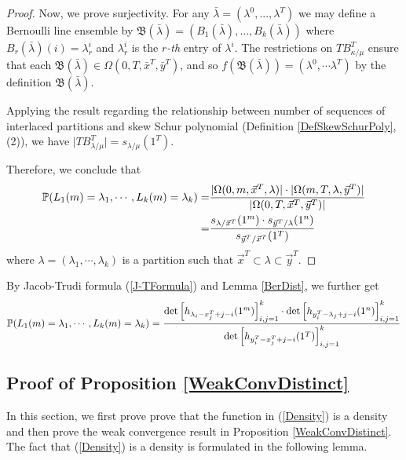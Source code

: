 \begin{proof}
Now, we prove surjectivity. For any $\bar\lambda=(\lambda^0,...,\lambda^T)$ we may define a Bernoulli line ensemble by $\mathfrak{B}(\bar\lambda)=(B_1(\bar\lambda),...,B_k(\bar\lambda))$ where $B_r(\bar\lambda)(i)=\lambda^i_r$ and $\lambda^i_r$ is the $r$\textit{-th} entry of $\lambda^i$. The restrictions on $TB_{\kappa/\mu}^T$ ensure that each $\mathfrak{B}(\bar\lambda)\in \Omega(0,T,\bar x^T,\bar y^T)$, and so $f(\mathfrak B(\bar{\lambda}))=(\lambda^0,\cdots \lambda^T)$ by the definition $\mathfrak{B}(\bar\lambda)$. 

Applying the result regarding the relationship between number of sequences of interlaced partitions and skew Schur polynomial (Definition \ref{DefSkewSchurPoly}, (2)), we have $\lvert TB_{\lambda/\mu}^T\rvert =s_{\lambda/\mu}(1^T)$.

Therefore, we conclude that 
\begin{align*}
\mathbb{P}(L_1(m)=\lambda_1,\cdots, L_k(m)=\lambda_k)
=&{}\frac{\lvert \Omega(0, m, \vec{x}^T, \lambda)\rvert\cdot \lvert \Omega(m, T, \lambda, \vec{y}^T)\rvert}{\lvert \Omega(0, T, \vec{x}^T, \vec{y}^T)\rvert}\\
=&{}\frac{s_{\lambda/\vec{x}^T}(1^{m})\cdot s_{\vec{y}^T/\lambda}(1^{n})}{s_{\vec{y}^T/\vec{x}^T}(1^T)}
\end{align*} where $\lambda=(\lambda_{1},\cdots,\lambda_{k})$ is a partition such that $\vec{x}^{T}\subset\lambda\subset\vec{y}^{T}$.
\end{proof}

By Jacob-Trudi formula (\ref	{J-TFormula}) and Lemma \ref	{BerDist}, we further get
\begin{align}{\label{BerDistJT}}
	\begin{split}
		\mathbb{P}(L_1(m)=\lambda_1,\cdots, L_k(m)=\lambda_k)=\frac{\det\left[h_{\lambda_{i}-x_{j}^{T}+j-i}(1^{m})\right]_{i,j=1}^{k}\cdot\det\left[h_{y_{i}^{T}-\lambda_{j}+j-i}(1^{n})\right]_{i,j=1}^{k}}{\det\left[h_{y_{i}^{T}-x_{j}^{T}+j-i}(1^{T})\right]_{i,j=1}^{k}}
	\end{split}
\end{align}

\subsection{Proof of Proposition \ref{WeakConvDistinct}}{\label{ProofProp1}} In this section, we first prove prove that the function in (\ref{Density}) is a density and then prove the weak convergence result in Proposition \ref{WeakConvDistinct}. The fact that (\ref{Density}) is a density is formulated in the following lemma.

